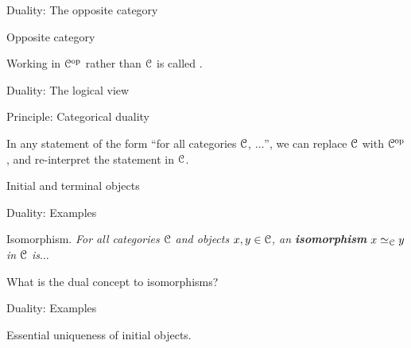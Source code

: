 \begin{frame}[t]{Duality: The opposite category} %

  \par{} Opposite category
  \vspace{5 \baselineskip}

  \par{}

  \vspace{7 \baselineskip}
  \par Working in $\mathcal{C}^{\mathrm{op}}$ rather than $\mathcal{C}$ is called .
  
\end{frame}

\begin{frame}[t]{Duality: The logical view} %

  \begin{block}{Principle: Categorical duality}
    \par In any statement of the form ``for all categories $\mathcal{C}$, $\dots$'', we can replace $\mathcal{C}$ with $\mathcal{C}^{\mathrm{op}}$, and re-interpret the statement in $\mathcal{C}$.
  \end{block}

  \par{} Initial and terminal objects
  
\end{frame}

\begin{frame}[t]{Duality: Examples} %

  \par{} Isomorphism. \textit{For all categories $\mathcal{C}$ and objects $x, y \in \mathcal{C}$, an \textbf{isomorphism} $x \simeq_{\mathcal{C}} y$ in $\mathcal{C}$ is$\dots$}
  \vspace{6\baselineskip}
  \par{} What is the dual concept to isomorphisms?
  
\end{frame}

\begin{frame}[t]{Duality: Examples} %

  \par{} Essential uniqueness of initial objects.
  \vspace{10\baselineskip}
  \par{}
  
\end{frame}
